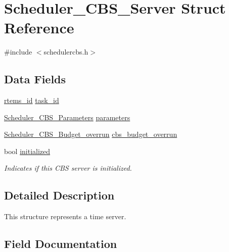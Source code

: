 \hypertarget{structScheduler__CBS__Server}{}\section{Scheduler\+\_\+\+C\+B\+S\+\_\+\+Server Struct Reference}
\label{structScheduler__CBS__Server}


{\ttfamily \#include $<$schedulercbs.\+h$>$}

\subsection*{Data Fields}
\begin{DoxyCompactItemize}
\item 
\mbox{\hyperlink{group__ClassicTasks_gab20892b814dced7dd4e5b9bf42becd57}{rtems\+\_\+id}} \mbox{\hyperlink{structScheduler__CBS__Server_abb5087e9bdf465873ac70c42f5ad7b8a}{task\+\_\+id}}
\item 
\mbox{\hyperlink{structScheduler__CBS__Parameters}{Scheduler\+\_\+\+C\+B\+S\+\_\+\+Parameters}} \mbox{\hyperlink{structScheduler__CBS__Server_a684fe7209466d1c4425285f9739fec12}{parameters}}
\item 
\mbox{\hyperlink{group__RTEMSScoreSchedulerCBS_ga71e1a7a66ea3c1fcb7e25e900f773858}{Scheduler\+\_\+\+C\+B\+S\+\_\+\+Budget\+\_\+overrun}} \mbox{\hyperlink{structScheduler__CBS__Server_ad2817709af3344fc142b0b5e1db2b5f7}{cbs\+\_\+budget\+\_\+overrun}}
\item 
bool \mbox{\hyperlink{structScheduler__CBS__Server_ac04a4372423b4dd93e1d1bb7c8150bc6}{initialized}}
\begin{DoxyCompactList}\small\item\em Indicates if this C\+BS server is initialized. \end{DoxyCompactList}\end{DoxyCompactItemize}


\subsection{Detailed Description}
This structure represents a time server. 

\subsection{Field Documentation}
\mbox{\label{structScheduler__CBS__Server_ad2817709af3344fc142b0b5e1db2b5f7}} 
